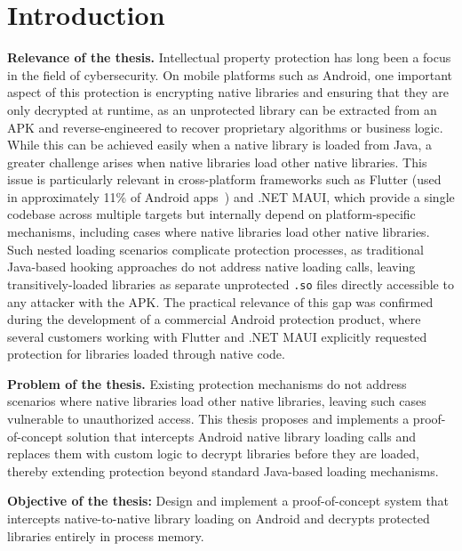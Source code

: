 \documentclass[11pt,a4paper]{report}
\renewcommand\_{{\textunderscore\allowbreak}}
\begin{document}
\newpage

\section*{Introduction}

\textbf{Relevance of the thesis.} Intellectual property protection has long been a focus in the field of cybersecurity. On mobile platforms such as Android, one important aspect of this protection is encrypting native libraries and ensuring that they are only decrypted at runtime, as an unprotected library can be extracted from an APK and reverse-engineered to recover proprietary algorithms or business logic. While this can be achieved easily when a native library is loaded from Java, a greater challenge arises when native libraries load other native libraries. This issue is particularly relevant in cross-platform frameworks such as Flutter (used in approximately 11\% of Android apps~\cite{appfigures2024flutter}) and .NET MAUI, which provide a single codebase across multiple targets but internally depend on platform-specific mechanisms, including cases where native libraries load other native libraries. Such nested loading scenarios complicate protection processes, as traditional Java-based hooking approaches do not address native loading calls, leaving transitively-loaded libraries as separate unprotected \texttt{.so} files directly accessible to any attacker with the APK. The practical relevance of this gap was confirmed during the development of a commercial Android protection product, where several customers working with Flutter and .NET MAUI explicitly requested protection for libraries loaded through native code.

\textbf{Problem of the thesis.} Existing protection mechanisms do not address scenarios where native libraries load other native libraries, leaving such cases vulnerable to unauthorized access. This thesis proposes and implements a proof-of-concept solution that intercepts Android native library loading calls and replaces them with custom logic to decrypt libraries before they are loaded, thereby extending protection beyond standard Java-based loading mechanisms.

\textbf{Objective of the thesis:} Design and implement a proof-of-concept system that intercepts native-to-native library loading on Android and decrypts protected libraries entirely in process memory.
\end{document}
